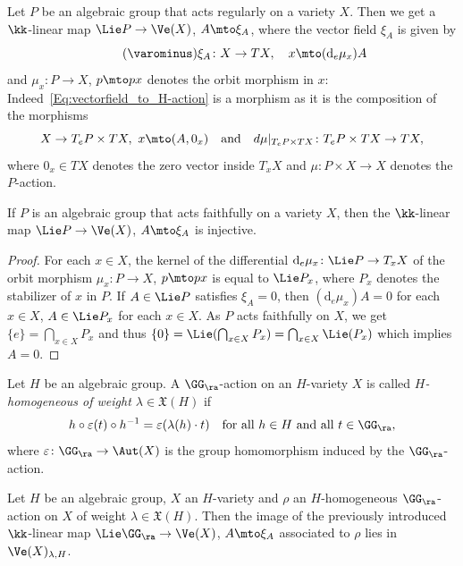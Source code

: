 Let $P$ be an algebraic group that acts regularly on a variety $X$.
Then we get a $\kk$-linear map $\Lie P \to \Ve(X)$,
$A \mto \xi_A$, where the vector field $\xi_A$ is given by
\[
\label{Eq:vectorfield_to_H-action}
\tag{$\varominus$}
\xi_A \colon X \to TX, \quad x \mto (\textrm{d}_e \mu_x) A
\]
and $\mu_x \colon P \to X$, $p \mto p x$ denotes the orbit morphism in $x$: Indeed~\eqref{Eq:vectorfield_to_H-action} is a morphism as it is the composition of the morphisms
\[
X \to T_e P \times TX, \ x \mto (A, 0_x) \quad \textrm{and} \quad
d \mu |_{T_e P \times TX} \colon T_e P \times TX \to TX,
\]
where $0_x \in TX$ denotes the zero vector inside $T_x X$ and
$\mu \colon P \times X \to X$ denotes the $P$-action.

\begin{lemma}
\label{lem.faithfull_action}
If $P$ is an algebraic group that acts faithfully on a variety $X$, then the
$\kk$-linear map $\Lie P \to \Ve(X)$, $A \mto \xi_A$ is injective.
\end{lemma}

\begin{proof}
For each $x \in X$, the kernel of the differential $\textrm{d}_e \mu_x \colon \Lie P \to T_x X$ of
the orbit morphism $\mu_x \colon P \to X$, $p \mto p x$ is equal to $\Lie P_x$, where
$P_x$ denotes the stabilizer of $x$ in $P$. If $A \in \Lie P$ satisfies $\xi_A = 0$, then
$(\textrm{d}_e \mu_x)A = 0$ for each $x \in X$, \ie $A \in \Lie P_x$ for each $x \in X$.
As $P$ acts faithfully on $X$, we get $\{e\} = \bigcap_{x \in X} P_x$ and thus
$\{0\} = \Lie( \bigcap_{x \in X} P_x ) = \bigcap_{x \in X} \Lie(P_ x)$ which implies $A = 0$.
\end{proof}

Let $H$ be an algebraic group. A $\GG_\ra$-action on an $H$-variety $X$ is called
\emph{$H$-homo\-geneous of weight $\lambda \in \mathfrak{X}(H)$} if
\[
h \circ \varepsilon(t) \circ h^{-1} = \varepsilon(\lambda(h) \cdot t) \quad
\textrm{for all $h \in H$ and all $t \in \GG_\ra$},
\]
where $\varepsilon \colon \GG_\ra \to \Aut(X)$ is the group homomorphism
induced by the $\GG_\ra$-action.

\begin{lemma}
\label{lem.H-homogeneous_Ga-action}
Let $H$ be an algebraic group, $X$ an $H$-variety and
$\rho$ an $H$-homo\-ge\-neous $\GG_\ra$-action on $X$
of weight $\lambda \in \mathfrak{X}(H)$. Then the image
of the previously introduced $\kk$\nobreakdash-linear map
$\Lie \GG_\ra \to \Ve(X)$, $A \mto \xi_A$ associated to $\rho$
lies in $\Ve(X)_{\lambda, H}$.
\end{lemma}

